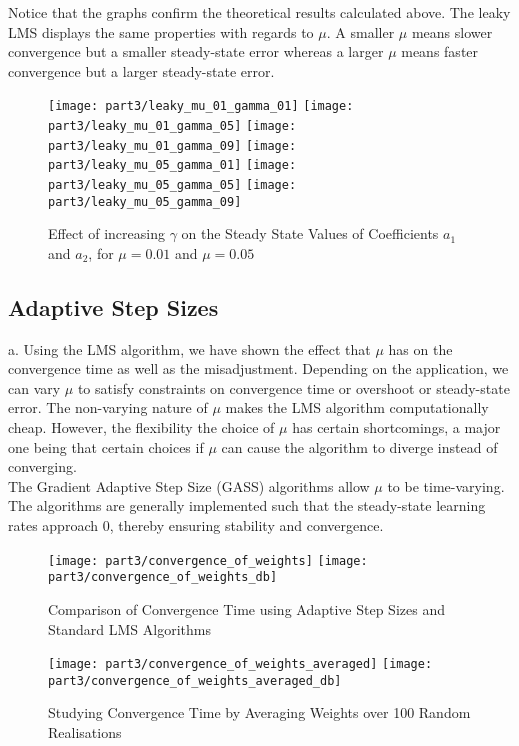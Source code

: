 \noindent{}Notice that the graphs confirm the theoretical results calculated above. The leaky LMS displays the same properties with regards to $\mu$. A smaller $\mu$ means slower convergence but a smaller steady-state error whereas a larger $\mu$ means faster convergence but a larger steady-state error. 

\begin{figure}[H]
\centering{}
\texttt{[image: part3/leaky\_mu\_01\_gamma\_01]}
\texttt{[image: part3/leaky\_mu\_01\_gamma\_05]}
\texttt{[image: part3/leaky\_mu\_01\_gamma\_09]}
\texttt{[image: part3/leaky\_mu\_05\_gamma\_01]}
\texttt{[image: part3/leaky\_mu\_05\_gamma\_05]}
\texttt{[image: part3/leaky\_mu\_05\_gamma\_09]}
\caption{Effect of increasing $\gamma$ on the Steady State Values of Coefficients $a_1$ and $a_2$, for $\mu=0.01$ and $\mu=0.05$}
\label{fig:leaky_lms}
\end{figure}

\subsection{Adaptive Step Sizes}

\noindent{}a. Using the LMS algorithm, we have shown the effect that $\mu$ has on the convergence time as well as the misadjustment. Depending on the application, we can vary $\mu$ to satisfy constraints on convergence time or overshoot or steady-state error. The non-varying nature of $\mu$ makes the LMS algorithm computationally cheap. However, the flexibility the choice of $\mu$ has certain shortcomings, a major one being that certain choices if $\mu$ can cause the algorithm to diverge instead of converging. \\

\noindent{}The Gradient Adaptive Step Size (GASS) algorithms allow $\mu$ to be time-varying. The algorithms are generally implemented such that the steady-state learning rates approach 0, thereby ensuring stability and convergence. 

\begin{figure}[H]
\centering{}
\texttt{[image: part3/convergence\_of\_weights]}
\texttt{[image: part3/convergence\_of\_weights\_db]}
\caption{Comparison of Convergence Time using Adaptive Step Sizes and Standard LMS Algorithms}
\end{figure}


\begin{figure}[H]
\centering{}
\texttt{[image: part3/convergence\_of\_weights\_averaged]}
\texttt{[image: part3/convergence\_of\_weights\_averaged\_db]}
\caption{Studying Convergence Time by Averaging Weights over 100 Random Realisations}
\end{figure}


